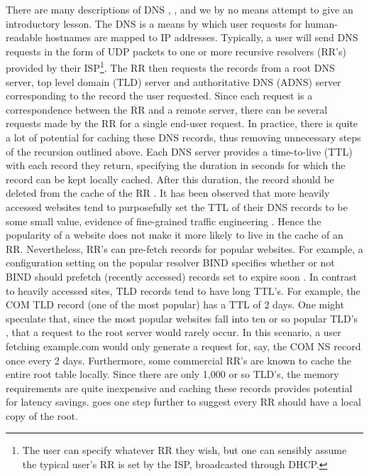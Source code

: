 \documentclass[sigconf,nonacm,10pt]{acmart}
\begin{document}
There are many descriptions of DNS \cite{kurose2010computer},
\cite{cloudflare_dns_tutorial}, and we by no means attempt to give an
introductory lesson. The DNS is a means by which user requests for
human-readable hostnames are mapped to IP addresses. Typically, a user
will send DNS requests in the form of UDP packets to one or more
recursive resolvers (RR's) provided by their
ISP\footnote{ The user can specify whatever RR they wish, but one can sensibly assume the typical user's RR is set by the ISP, broadcasted through DHCP. }.
The RR then requests the records from a root DNS server, top level
domain (TLD) server and authoritative DNS (ADNS) server corresponding to
the record the user requested. Since each request is a correspondence
between the RR and a remote server, there can be several requests made
by the RR for a single end-user request. \break \break
In practice, there is quite a lot of potential for caching these DNS
records, thus removing unnecessary steps of the recursion outlined
above. Each DNS server provides a time-to-live (TTL) with each record
they return, specifying the duration in seconds for which the record can
be kept locally cached. After this duration, the record should be
deleted from the cache of the RR \cite{rfc_1035}. It has been observed
that more heavily accessed websites tend to purposefully set the TTL of
their DNS records to be some small value, evidence of fine-grained
traffic engineering \cite{callahan2013modern}. Hence the popularity of a
website does not make it more likely to live in the cache of an RR.
Nevertheless, RR's can pre-fetch records for popular websites. For
example, a configuration setting on the popular resolver BIND specifies
whether or not BIND should prefetch (recently accessed) records set to
expire soon \cite{bind9_config}. In contrast to heavily accessed sites,
TLD records tend to have long TTL's. For example, the COM TLD record
(one of the most popular) has a TTL of 2 days. One might speculate that,
since the most popular websites fall into ten or so popular TLD's
\cite{alexa_topsites}, that a request to the root server would rarely
occur. In this scenario, a user fetching example.com would only generate
a request for, say, the COM NS record once every 2 days. Furthermore,
some commercial RR's are known to cache the entire root table locally.
Since there are only 1,000 or so TLD's, the memory requirements are
quite inexpensive and caching these records provides potential for
latency savings. \cite{allman_eliminate} goes one step further to
suggest every RR should have a local copy of the root. \break
\end{document}
